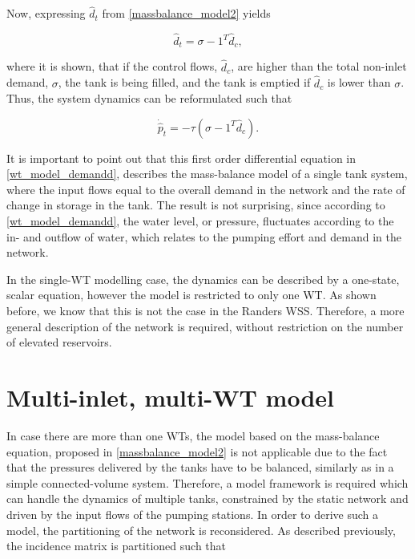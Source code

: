 Now, expressing $\hat{d}_t $ from \eqref{massbalance_model2} yields

\begin{equation}
\label{massbalance_model2_1}
\hat{d}_t  = \sigma - 1^T \hat{d}_c,
\end{equation}

where it is shown, that if the control flows, $\hat{d}_c$, are higher than the total non-inlet demand, $\sigma$, the tank is being filled, and the tank is emptied if $\hat{d}_c$ is lower than $\sigma$. Thus, the system dynamics can be reformulated such that

\begin{equation}
\label{wt_model_demandd}
\dot{\hat{p}}_t = -\tau (\sigma - 1^T \hat{d}_c).
\end{equation}

It is important to point out that this first order differential equation in \eqref{wt_model_demandd}, describes the mass-balance model of a single tank system, where the input flows equal to the overall demand in the network and the rate of change in storage in the tank. The result is not surprising, since according to \eqref{wt_model_demandd}, the water level, or pressure, fluctuates according to the in- and outflow of water, which relates to the pumping effort and demand in the network. 

In the single-WT modelling case, the dynamics can be described by a one-state, scalar equation, however the model is restricted to only one WT. As shown before, we know that this is not the case in the Randers WSS. Therefore, a more general description of the network is required, without restriction on the number of elevated reservoirs. 


\section{Multi-inlet, multi-WT model}
\label{multi_inlet_multi_WT_model}

In case there are more than one WTs, the model based on the mass-balance equation, proposed in \eqref{massbalance_model2} is not applicable due to the fact that the pressures delivered by the tanks have to be balanced, similarly as in a simple connected-volume system. Therefore, a model framework is required which can handle the dynamics of multiple tanks, constrained by the static network and driven by the input flows of the pumping stations. In order to derive such a model, the partitioning of the network is reconsidered. As described previously, the incidence matrix is partitioned such that 

